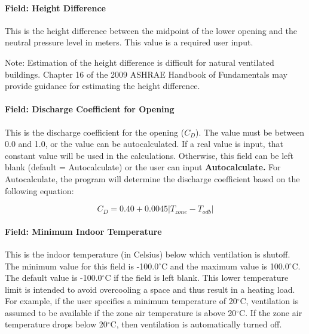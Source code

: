 \paragraph{Field: Height Difference}\label{field-height-difference}

This is the height difference between the midpoint of the lower opening and the neutral pressure level in meters. This value is a required user input.

Note: Estimation of the height difference is difficult for natural ventilated buildings. Chapter 16 of the 2009 ASHRAE Handbook of Fundamentals may provide guidance for estimating the height difference.

\paragraph{Field: Discharge Coefficient for Opening}\label{field-discharge-coefficient-for-opening}

This is the discharge coefficient for the opening ($C_{D}$). The value must be between 0.0 and 1.0, or the value can be autocalculated. If a real value is input, that constant value will be used in the calculations. Otherwise, this field can be left blank (default = Autocalculate) or the user can input \textbf{Autocalculate.} For Autocalculate, the program will determine the discharge coefficient based on the following equation:

\begin{equation}
{C_D} = 0.40 + 0.0045\left| {{T_{zone}} - {T_{odb}}} \right|
\end{equation}

\paragraph{Field: Minimum Indoor Temperature}\label{field-minimum-indoor-temperature-1}

This is the indoor temperature (in Celsius) below which ventilation is shutoff. The minimum value for this field is -100.0$^\circ$C and the maximum value is 100.0$^\circ$C. The default value is -100.0$^\circ$C if the field is left blank. This lower temperature limit is intended to avoid overcooling a space and thus result in a heating load. For example, if the user specifies a minimum temperature of 20$^\circ$C, ventilation is assumed to be available if the zone air temperature is above 20$^\circ$C. If the zone air temperature drops below 20$^\circ$C, then ventilation is automatically turned off.

